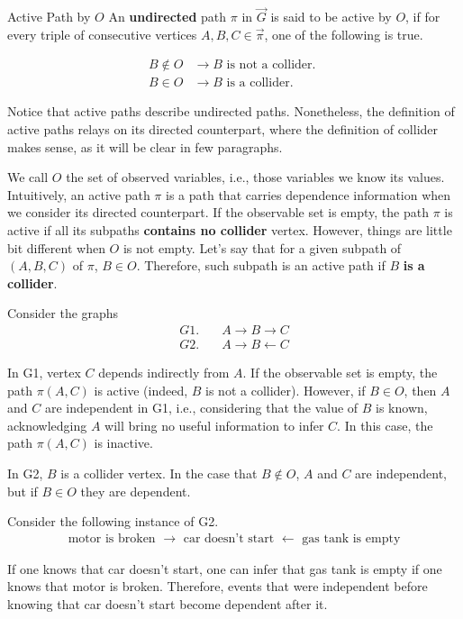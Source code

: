 \begin{definition}{Active Path by $O$}
An \textbf{undirected} path $\pi$ in $\vec{G}$ is said to be active by $O$, if for every triple of consecutive vertices $A,B,C \in \vec{\pi}$, one of the following is true.

\begin{align*}
	B \notin O & \rightarrow B \text{ is not a collider. }\\
	B \in O & \rightarrow B \text{ is a collider. }
\end{align*}

\end{definition}

Notice that active paths describe undirected paths. Nonetheless, the definition of active paths relays on its directed counterpart, where the definition of collider makes sense, as it will be clear in few paragraphs.

We call $O$ the set of observed variables, i.e., those variables we know its values. Intuitively, an active path $\pi$ is a path that carries dependence information when we consider its directed counterpart. If the observable set is empty, the path $\pi$ is active if all its subpaths \textbf{contains no collider} vertex. However, things are little bit different when $O$ is not empty. Let's say that for a given subpath of $(A,B,C)$ of $\pi$, $B \in O$. Therefore, such subpath is an active path if $B$ \textbf{is a collider}.

\begin{example}
Consider the graphs
\begin{align*}
G1.& \quad A \rightarrow B \rightarrow C\\
G2.& \quad A \rightarrow B \leftarrow C
\end{align*}

In G1, vertex $C$ depends indirectly from $A$. If the observable set is empty, the path $\pi(A,C)$ is active (indeed, $B$ is not a collider). However, if $B \in O$, then $A$ and $C$ are independent in G1, i.e., considering that the value of $B$ is known, acknowledging $A$ will bring no useful information to infer $C$. In this case, the path $\pi(A,C)$ is inactive.

In G2, $B$ is a collider vertex. In the case that $B \notin O$, $A$ and $C$ are independent, but if $B \in O$ they are dependent.
\end{example}

\begin{example}
Consider the following instance of G2.
\begin{align*}
	\text{ motor is broken } \rightarrow \text{ car doesn't start } \leftarrow \text{ gas tank is empty }
\end{align*}

If one knows that \textsf{car doesn't start}, one can infer that \textsf{gas tank is empty} if one knows that \textsf{motor is broken}. Therefore, events that were independent before knowing that \textsf{car doesn't start} become dependent after it.

\end{example}

